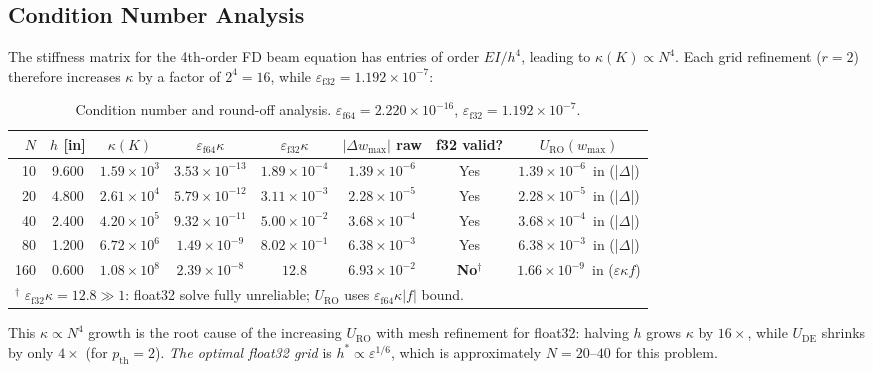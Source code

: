 \documentclass[11pt,letterpaper]{article}
\newcommand{\UDE}{U_{\mathrm{DE}}}
\newcommand{\URO}{U_{\mathrm{RO}}}
\newcommand{\pth}{p_{\mathrm{th}}}
\newcommand{\EI}{EI}
\begin{document}
\subsection{Condition Number Analysis}

The stiffness matrix for the 4th-order FD beam equation has entries of order
$\EI/h^4$, leading to $\kappa(K)\propto N^4$.  Each grid refinement ($r=2$)
therefore increases $\kappa$ by a factor of $2^4=16$, while
$\varepsilon_{\mathrm{f32}}=1.192\times10^{-7}$:

\begin{table}[h!]
\centering
\caption{Condition number and round-off analysis. $\varepsilon_{\mathrm{f64}}=2.220\times10^{-16}$,
$\varepsilon_{\mathrm{f32}}=1.192\times10^{-7}$.}
\label{tab:roundoff}
\small
\begin{tabular}{rccccccc}
  \toprule
  $N$ & $h$ [in] & $\kappa(K)$ & $\varepsilon_{\mathrm{f64}}\kappa$ & $\varepsilon_{\mathrm{f32}}\kappa$ &
  $|\Delta w_{\max}|$ raw & f32 valid? & $\URO(w_{\max})$ \\
  \midrule
  10  & 9.600 & $1.59\times10^{3}$ & $3.53\times10^{-13}$ & $1.89\times10^{-4}$ & $1.39\times10^{-6}$ & Yes & $1.39\times10^{-6}$~in (|$\Delta$|) \\
  20  & 4.800 & $2.61\times10^{4}$ & $5.79\times10^{-12}$ & $3.11\times10^{-3}$ & $2.28\times10^{-5}$ & Yes & $2.28\times10^{-5}$~in (|$\Delta$|) \\
  40  & 2.400 & $4.20\times10^{5}$ & $9.32\times10^{-11}$ & $5.00\times10^{-2}$ & $3.68\times10^{-4}$ & Yes & $3.68\times10^{-4}$~in (|$\Delta$|) \\
  80  & 1.200 & $6.72\times10^{6}$ & $1.49\times10^{-9}$  & $8.02\times10^{-1}$ & $6.38\times10^{-3}$ & Yes & $6.38\times10^{-3}$~in (|$\Delta$|) \\
  160 & 0.600 & $1.08\times10^{8}$ & $2.39\times10^{-8}$  & $\mathbf{12.8}$     & $6.93\times10^{-2}$ & \textbf{No}$^\dagger$ & $1.66\times10^{-9}$~in ($\varepsilon\kappa f$) \\
  \bottomrule
  \multicolumn{8}{l}{$^\dagger$ $\varepsilon_{\mathrm{f32}}\kappa=12.8\gg1$: float32 solve fully unreliable; $\URO$ uses $\varepsilon_{\mathrm{f64}}\kappa|f|$ bound.}
\end{tabular}
\end{table}

\noindent
This $\kappa\propto N^4$ growth is the root cause of the increasing $\URO$
with mesh refinement for float32: halving $h$ grows $\kappa$ by $16\times$,
while $\UDE$ shrinks by only $4\times$ (for $\pth=2$).  \emph{The optimal
float32 grid} is $h^*\propto\varepsilon^{1/6}$, which is approximately
$N=20$--$40$ for this problem.
\end{document}
